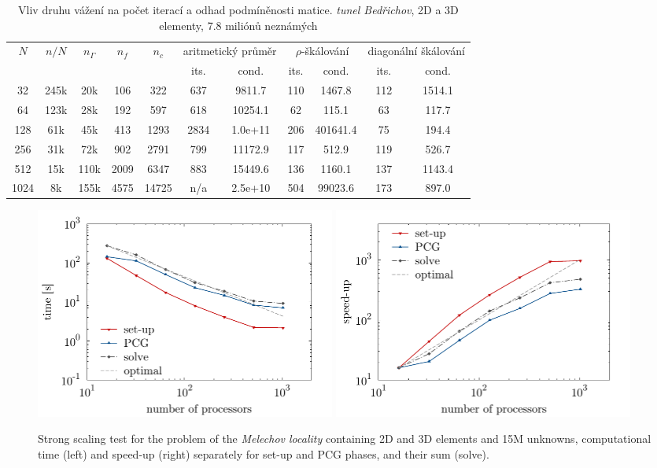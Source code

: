 \begin{table}[t]
\begin{center}
\begin{tabular}
[c]{|cc|ccc|cc|cc|cc|}\hline
\multirow{2}{*}{$N$} & \multirow{2}{*}{$n/N$} &
\multirow{2}{*}{$n_{\Gamma}$} & \multirow{2}{*}{$n_f$} &
\multirow{2}{*}{$n_c$} & \multicolumn{2}{c|}{aritmetický průměr} 
&
\multicolumn{2}{c|}{$\rho$-škálování} & \multicolumn{2}{c|}{diagonální 
škálování}\\
&  &  &  &  & its. & cond. & its. & cond. & its. & cond.\\\hline
32 & 245k & 20k & 106 & 322 & 637 & 9811.7 & 110 & 1467.8 & 112 & 1514.1\\
64 & 123k & 28k & 192 & 597 & 618 & 10254.1 & 62 & 115.1 & 63 & 117.7\\
128 & 61k & 45k & 413 & 1293 & 2834 & 1.0e+11 & 206 & 401641.4 & 75 & 194.4\\
256 & 31k & 72k & 902 & 2791 & 799 & 11172.9 & 117 & 512.9 & 119 & 526.7\\
512 & 15k & 110k & 2009 & 6347 & 883 & 15449.6 & 136 & 1160.1 & 137 & 1143.4\\
1024 & 8k & 155k & 4575 & 14725 & n/a & 2.5e+10 & 504 & 99023.6 & 173 &
897.0\\\hline
\end{tabular}
\end{center}
\caption{\label{tab:tunnel_averaging}
Vliv druhu vážení na počet iterací a odhad podmíněnosti matice.
\emph{tunel Bedřichov}, 2D a 3D elementy, 7.8 miliónů neznámých}
\end{table}

\begin{figure}[h]
\begin{center}
\includegraphics[width=0.48\textwidth]{timing_melechov_large} 
\includegraphics[width=0.48\textwidth]{speedup_melechov_large}
\end{center}
\caption{\label{fig:timing_Melechov_large}
Strong scaling test for the problem of the \emph{Melechov locality}
containing 2D and 3D elements and 15M unknowns, computational time (left) and
speed-up (right) separately for set-up and PCG phases, and their sum (solve).}
\end{figure}

